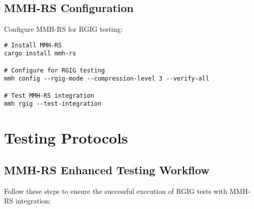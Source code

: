 \subsection*{MMH-RS Configuration}
Configure MMH-RS for RGIG testing:

\begin{verbatim}
# Install MMH-RS
cargo install mmh-rs

# Configure for RGIG testing
mmh config --rgig-mode --compression-level 3 --verify-all

# Test MMH-RS integration
mmh rgig --test-integration
\end{verbatim}

\section*{Testing Protocols}

\subsection*{MMH-RS Enhanced Testing Workflow}
Follow these steps to ensure the successful execution of RGIG tests with MMH-RS integration:

